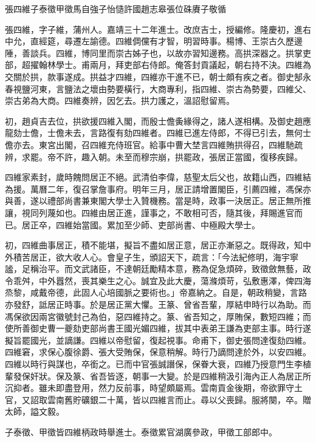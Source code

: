 
\begin{pinyinscope}
張四維子泰徵甲徵馬自強子怡慥許國趙志皋張位硃賡子敬循

張四維，字子維，蒲州人。嘉靖三十二年進士。改庶吉士，授編修。隆慶初，進右中允，直經筵，尋遷左諭德。四維倜儻有才智，明習時事。楊博、王崇古久歷邊陲，善談兵。四維，博同里而崇古姊子也，以故亦習知邊務。高拱深器之。拱掌吏部，超擢翰林學士。甫兩月，拜吏部右侍郎。俺答封貢議起，朝右持不決。四維為交關於拱，款事遂成。拱益才四維，四維亦干進不已，朝士頗有疾之者。御史郜永春視鹽河東，言鹽法之壞由勢要橫行，大商專利，指四維、崇古為勢要，四維父、崇古弟為大商。四維奏辨，因乞去。拱力護之，溫詔慰留焉。

初，趙貞吉去位，拱欲援四維入閣，而殷士儋夤緣得之，諸人遂相構。及御史趙應龍劾士儋，士儋未去，言路復有劾四維者。四維已進左侍郎，不得已引去，無何士儋亦去。東宮出閣，召四維充侍班官。給事中曹大埜言四維賄拱得召，四維馳疏辨，求罷。帝不許，趣入朝。未至而穆宗崩，拱罷政，張居正當國，復移疾歸。

四維家素封，歲時餽問居正不絕。武清伯李偉，慈聖太后父也，故籍山西，四維結為援。萬曆二年，復召掌詹事府。明年三月，居正請增置閣臣，引薦四維，馮保亦與善，遂以禮部尚書兼東閣大學士入贊機務。當是時，政事一決居正。居正無所推讓，視同列蔑如也。四維由居正進，謹事之，不敢相可否，隨其後，拜賜進官而已。居正卒，四維始當國。累加至少師、吏部尚書、中極殿大學士。

初，四維曲事居正，積不能堪，擬旨不盡如居正意，居正亦漸惡之。既得政，知中外積苦居正，欲大收人心。會皇子生，頒詔天下，疏言：「今法紀修明，海宇寧謐，足稱治平。而文武諸臣，不達朝廷勵精本意，務為促急煩碎，致徵斂無藝，政令乖舛，中外囂然，喪其樂生之心。誠宜及此大慶，蕩滌煩苛，弘敷惠澤，俾四海烝黎，咸戴帝德，此固人心培國脈之要術也。」帝嘉納之。自是，朝政稍變，言路亦發舒，詆居正時事。於是居正黨大懼。王篆、曾省吾輩，厚結申時行以為助。而馮保欲因兩宮徽號封己為伯，惡四維持之。篆、省吾知之，厚賄保，數短四維；而使所善御史曹一夔劾吏部尚書王國光媚四維，拔其中表弟王謙為吏部主事。時行遂擬旨罷國光，並謫謙。四維以帝慰留，復起視事。命甫下，御史張問達復劾四維。四維窘，求保心腹徐爵、張大受賄保，保意稍解。時行乃謫問達於外，以安四維。四維以時行與謀也，卒銜之。已而中官張誠譖保，保眷大衰，四維乃授意門生李植輩發保奸狀。保及篆、省吾皆逐，朝事一大變。於是四維稍汲引海內正人為居正所沉抑者。雖未即盡登用，然力反前事，時望頗屬焉。雲南貢金後期，帝欲罪守土官，又詔取雲南舊貯礦銀二十萬，皆以四維言而止。尋以父喪歸。服將闋，卒。贈太師，謚文毅。

子泰徵、甲徵皆四維柄政時舉進士。泰徵累官湖廣參政，甲徵工部郎中。


\end{pinyinscope}
